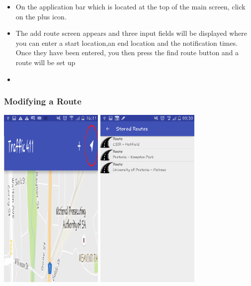 \documentclass[a4paper,12pt]{article}
\begin{document}
\begin{itemize}
    \item On the application bar which is located at the top of the main screen, click on the plus icon.
    \item The add route screen appears and three input fields will be displayed  where you can enter a start location,an end location and the notification times. Once they have been entered, you then press the find route button and a route will be set up
    \item 
\end{itemize}
\subsubsection{Modifying a Route}
\includegraphics[width=50mm, scale=0.5]{images/MainScreen3.png}
\includegraphics[width=50mm, scale=0.5]{images/StoredRoutes2.png}
\end{document}
